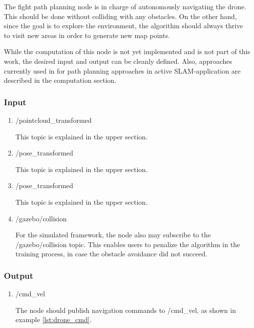 	The fight path planning node is in charge of autonomously navigating the drone. This should be done without colliding with any obstacles. 
	On the other hand, since the goal is to explore the environment, the algorithm should always thrive to visit new areas in order to generate 
	new map points. 
	
	While the computation of this node is not yet implemented and is not part of this work, the desired input and output can be cleanly defined. 
	Also, approaches currently used in for path planning approaches in active SLAM-application are described in the computation section. 
	
	\subsubsection{Input}
	
	\begin{enumerate}
	\item{/pointcloud\_transformed}
	
	This topic is explained in the upper section. 
	
	\item{/pose\_transformed}
	
	This topic is explained in the upper section.
	
	\item{/pose\_transformed}
	
	This topic is explained in the upper section.
	
	\item{/gazebo/collision}
	
	For the simulated framework, the node also may subscribe to the /gazebo/collision topic. This enables users to penalize the algorithm in the training 
	process, in case the obstacle avoidance did not succeed.
	
	
	\end{enumerate}
	
	\subsubsection{Output}
	
	\begin{enumerate}
	\item{/cmd\_vel}
	
	The node should publish navigation commands to /cmd\_vel, as shown in example \ref{lst:drone_cmd}.
	
	\end{enumerate}
	
